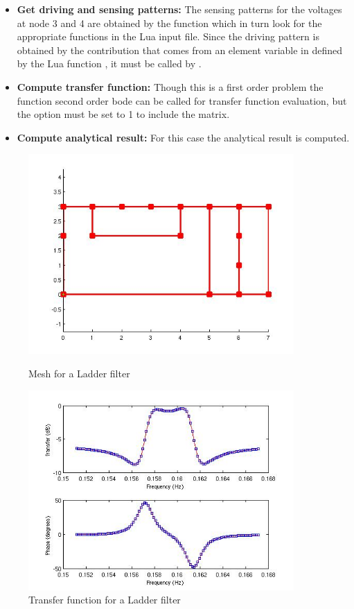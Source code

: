 \begin{itemize}

  \item{\textbf{Get driving and sensing patterns:}}
  The sensing patterns for the voltages at node 3 and 4
  are obtained by the function 
  which in turn look for the appropriate functions in the
  Lua input file. Since the driving pattern is obtained
  by the contribution that comes from an element variable
  in  defined by the Lua function
  , it must be called by
  .

  \item{\textbf{Compute transfer function:}}
  Though this is a first
  order problem the function second order bode can be
  called for transfer function evaluation, but the
  option   must be set to 1 to include the
   matrix.

  \item{\textbf{Compute analytical result:}}
  For this case the analytical result is computed.

\end{itemize}

\begin{figure}[htbp]
\centering
\includegraphics[height = 3in]{fig/ladder_filter_mesh.jpg}
\caption{Mesh for a Ladder filter}
\label{fig:LadderFilterMesh}
\includegraphics[height = 3in]{fig/ladder_filter_transfer.jpg}
\caption{Transfer function  for a Ladder filter}
\label{fig:LadderFilterTransfer}
\end{figure}

